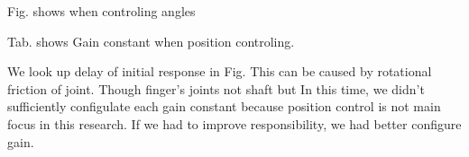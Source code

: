 \documentclass{llncs}
\begin{document}
Fig. shows  when controling angles 



Tab. shows Gain constant when position controling.


We look up delay of initial response in Fig.
This can be caused by rotational friction of joint.
Though finger's joints 
not shaft but 
In this time, we didn't sufficiently configulate each gain constant because position control is not main focus in this research.
If we had to improve responsibility, we had better configure gain.
\end{document}
